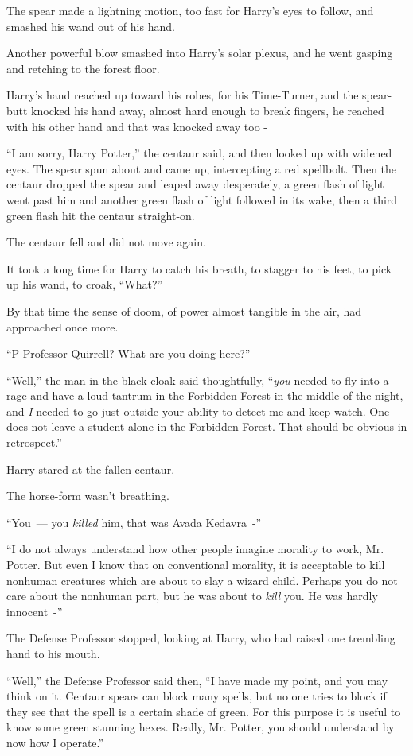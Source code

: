 The spear made a lightning motion, too fast for Harry's eyes to follow, and smashed his wand out of his hand.

Another powerful blow smashed into Harry's solar plexus, and he went gasping and retching to the forest floor.

Harry's hand reached up toward his robes, for his Time-Turner, and the spear-butt knocked his hand away, almost hard enough to break fingers, he reached with his other hand and that was knocked away too -

``I am sorry, Harry Potter,'' the centaur said, and then looked up with widened eyes. The spear spun about and came up, intercepting a red spellbolt. Then the centaur dropped the spear and leaped away desperately, a green flash of light went past him and another green flash of light followed in its wake, then a third green flash hit the centaur straight-on.

The centaur fell and did not move again.

It took a long time for Harry to catch his breath, to stagger to his feet, to pick up his wand, to croak, ``What?''

By that time the sense of doom, of power almost tangible in the air, had approached once more.

``P-Professor Quirrell? What are you doing here?''

``Well,'' the man in the black cloak said thoughtfully, ``\emph{you} needed to fly into a rage and have a loud tantrum in the Forbidden Forest in the middle of the night, and \emph{I} needed to go just outside your ability to detect me and keep watch. One does not leave a student alone in the Forbidden Forest. That should be obvious in retrospect.''

Harry stared at the fallen centaur.

The horse-form wasn't breathing.

``You~--- you \emph{killed} him, that was Avada Kedavra~-''

``I do not always understand how other people imagine morality to work, Mr. Potter. But even I know that on conventional morality, it is acceptable to kill nonhuman creatures which are about to slay a wizard child. Perhaps you do not care about the nonhuman part, but he was about to \emph{kill} you. He was hardly innocent~-''

The Defense Professor stopped, looking at Harry, who had raised one trembling hand to his mouth.

``Well,'' the Defense Professor said then, ``I have made my point, and you may think on it. Centaur spears can block many spells, but no one tries to block if they see that the spell is a certain shade of green. For this purpose it is useful to know some green stunning hexes. Really, Mr. Potter, you should understand by now how I operate.''

